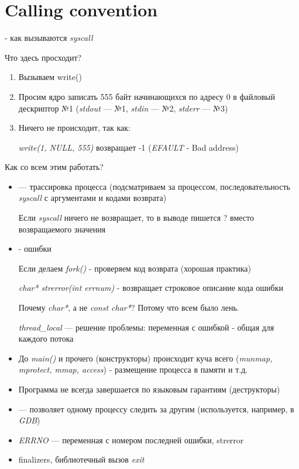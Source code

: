 \documentclass[../lectures.tex]{subfiles}
\begin{document}
\section{Calling convention}
 - как вызываются \emph{syscall}


Что здесь просходит?
\begin{enumerate}
    \item Вызываем write()
    \item Просим ядро записать 555 байт начинающихся по адресу 0 в файловый дескриптор №1 
          (\emph{stdout} --- №1, \emph{stdin} --- №2, \emph{stderr} --- №3)
    \item Ничего не происходит, так как:

          \emph{write(1, NULL, 555)} возвращает -1 (\emph{EFAULT} - Bad address)
\end{enumerate}

Как со всем этим работать?
\begin{itemize}
    \item {} --- трассировка процесса (подсматриваем за процессом, 
          последовательность \emph{syscall} с аргументами и кодами возврата)

    Если \emph{syscall} ничего не возвращает, то в выводе пишется ? вместо возвращаемого значения

    \item {} - ошибки

    Если делаем \emph{fork()} - проверяем код возврата (хорошая практика)

    \emph{char* strerror(int errnum)} - возвращает строковое описание кода ошибки

    Почему \emph{char*}, а не \emph{const char*}? Потому что всем было лень.

    \emph{thread\_local} --- решение проблемы: переменная с ошибкой - общая для каждого потока

    \item До \emph{main()} и прочего (конструкторы) происходит куча всего 
          (\emph{munmap, mprotect, mmap, access}) - размещение процесса в памяти и т.д.

    \item Программа не всегда завершается по языковым гарантиям (деструкторы)

    \item {} --- позволяет одному процессу следить за другим (используется, например, в \emph{GDB})

    \item \emph{ERRNO} --- переменная с номером последней ошибки, strerror

    \item finalizers, библиотечный вызов \emph{exit}
\end{itemize}
\end{document}
